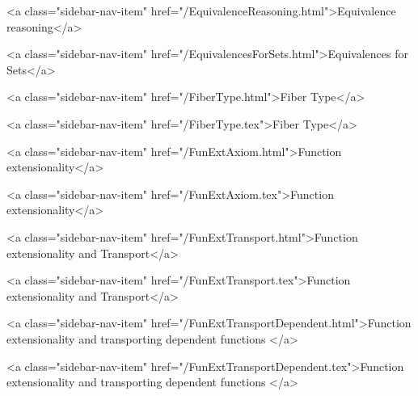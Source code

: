       
    
      
        
          <a class="sidebar-nav-item" href="/EquivalenceReasoning.html">Equivalence reasoning</a>
        
      
    
      
        
          <a class="sidebar-nav-item" href="/EquivalencesForSets.html">Equivalences for Sets</a>
        
      
    
      
        
          <a class="sidebar-nav-item" href="/FiberType.html">Fiber Type</a>
        
      
    
      
        
          <a class="sidebar-nav-item" href="/FiberType.tex">Fiber Type</a>
        
      
    
      
        
          <a class="sidebar-nav-item" href="/FunExtAxiom.html">Function extensionality</a>
        
      
    
      
        
          <a class="sidebar-nav-item" href="/FunExtAxiom.tex">Function extensionality</a>
        
      
    
      
        
          <a class="sidebar-nav-item" href="/FunExtTransport.html">Function extensionality and Transport</a>
        
      
    
      
        
          <a class="sidebar-nav-item" href="/FunExtTransport.tex">Function extensionality and Transport</a>
        
      
    
      
        
          <a class="sidebar-nav-item" href="/FunExtTransportDependent.html">Function extensionality and transporting dependent functions </a>
        
      
    
      
        
          <a class="sidebar-nav-item" href="/FunExtTransportDependent.tex">Function extensionality and transporting dependent functions </a>
        
      
    
